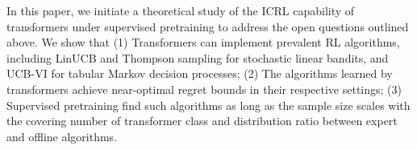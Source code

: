 \documentclass[10pt]{article}
\newcommand{\authnote}[2]{{\scriptsize $\ll$\textsf{#1 notes: #2}$\gg$}}
\newcommand{\authnote}[2]{}
\newcommand{\yub}[1]{{\color{red}\authnote{Yu}{#1}}}
\newcommand{\lc}[1]{{\color{blue}\authnote{Licong}{#1}}}
\begin{document}





In this paper, we initiate a theoretical study of the ICRL capability of transformers under supervised pretraining to address the open questions outlined above. We show that (1) Transformers can implement prevalent RL algorithms, including LinUCB and Thompson sampling for stochastic linear bandits, and UCB-VI for tabular Markov decision processes; (2) The algorithms learned by transformers achieve near-optimal regret bounds in their respective settings; (3) Supervised pretraining find such algorithms as long as the sample size scales with the covering number of transformer class and distribution ratio between expert and offline algorithms. %
\end{document}

